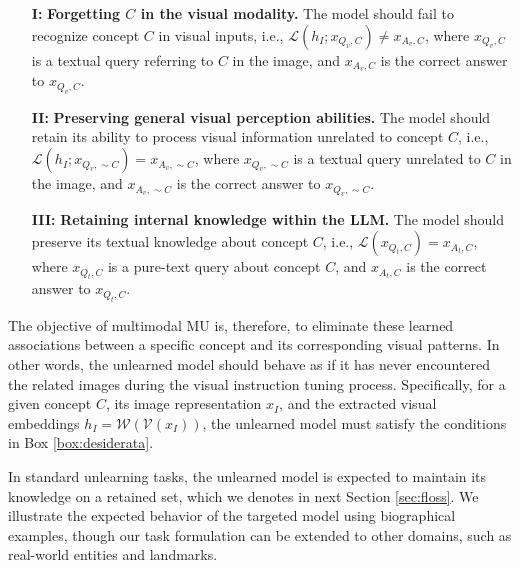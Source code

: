 \begin{tcolorbox}[float=t!,title=Desiderata for MLLM-based Multimodal Machine Unlearning]\label{box:desiderata}
    \begin{itemize}
        \item[\textbf{I:}] \textbf{Forgetting $C$ in the visual modality.} The model should fail to recognize concept $C$ in visual inputs, i.e., $\mathcal{L}(h_I; x_{Q_v,C}) \neq x_{A_v,C}$, where $x_{Q_v,C}$ is a textual query referring to $C$ in the image, and $x_{A_v,C}$ is the correct answer to $x_{Q_v,C}$.
        
        \item[\textbf{II:}] \textbf{Preserving general visual perception abilities.} The model should retain its ability to process visual information unrelated to concept $C$, i.e., $\mathcal{L}(h_I; x_{Q_v,\sim C}) = x_{A_v,\sim C}$, where $x_{Q_v,\sim C}$ is a textual query unrelated to $C$ in the image, and $x_{A_v,\sim C}$ is the correct answer to $x_{Q_v,\sim C}$.
        
        \item[\textbf{III:}] \textbf{Retaining internal knowledge within the LLM.} The model should preserve its textual knowledge about concept $C$, i.e., $\mathcal{L}(x_{Q_t,C}) = x_{A_t,C}$, where $x_{Q_t,C}$ is a pure-text query about concept $C$, and $x_{A_t,C}$ is the correct answer to $x_{Q_t,C}$.
    \end{itemize}
\end{tcolorbox}

The objective of multimodal MU is, therefore, to eliminate these learned associations between a specific concept and its corresponding visual patterns. In other words, the unlearned model should behave as if it has never encountered the related images during the visual instruction tuning process. Specifically, for a given concept $C$, its image representation $x_I$, and the extracted visual embeddings $h_I = \mathcal{W}(\mathcal{V}(x_I))$, the unlearned model must satisfy the conditions in 
Box \ref{box:desiderata}.

In standard unlearning tasks, the unlearned model is expected to maintain its knowledge on a retained set, which we denotes in next Section \ref{sec:floss}. We illustrate the expected behavior of the targeted model using biographical examples, though our task formulation can be extended to other domains, such as real-world entities and landmarks.

